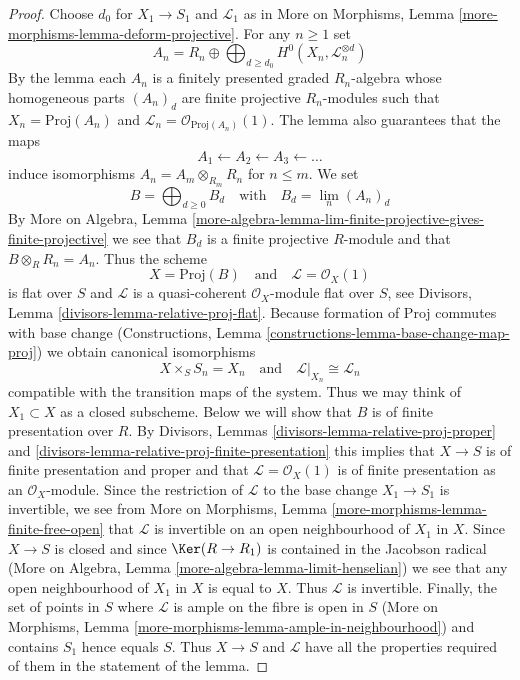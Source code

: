 \begin{proof}
Choose $d_0$ for $X_1 \to S_1$ and $\mathcal{L}_1$ as in
More on Morphisms, Lemma \ref{more-morphisms-lemma-deform-projective}.
For any $n \geq 1$ set
$$
A_n = R_n \oplus
\bigoplus\nolimits_{d \geq d_0} H^0(X_n, \mathcal{L}_n^{\otimes d})
$$
By the lemma each $A_n$ is a finitely presented graded $R_n$-algebra
whose homogeneous parts $(A_n)_d$ are finite projective $R_n$-modules
such that $X_n = \text{Proj}(A_n)$ and
$\mathcal{L}_n = \mathcal{O}_{\text{Proj}(A_n)}(1)$.
The lemma also guarantees that the maps
$$
A_1 \leftarrow A_2 \leftarrow A_3 \leftarrow \ldots
$$
induce isomorphisms $A_n = A_m \otimes_{R_m} R_n$ for $n \leq m$.
We set
$$
B = \bigoplus\nolimits_{d \geq 0} B_d
\quad\text{with}\quad
B_d = \lim_n (A_n)_d
$$
By More on Algebra, Lemma
\ref{more-algebra-lemma-lim-finite-projective-gives-finite-projective}
we see that $B_d$ is a finite projective $R$-module and that
$B \otimes_R R_n = A_n$. Thus the scheme
$$
X = \text{Proj}(B)
\quad\text{and}\quad
\mathcal{L} = \mathcal{O}_X(1)
$$
is flat over $S$ and $\mathcal{L}$ is a quasi-coherent $\mathcal{O}_X$-module
flat over $S$, see
Divisors, Lemma \ref{divisors-lemma-relative-proj-flat}.
Because formation of Proj commutes with base change
(Constructions, Lemma \ref{constructions-lemma-base-change-map-proj})
we obtain canonical isomorphisms
$$
X \times_S S_n = X_n
\quad\text{and}\quad
\mathcal{L}|_{X_n} \cong \mathcal{L}_n
$$
compatible with the transition maps of the system.
Thus we may think of $X_1 \subset X$ as a closed subscheme.
Below we will show that $B$ is of finite presentation over $R$.
By Divisors, Lemmas \ref{divisors-lemma-relative-proj-proper} and
\ref{divisors-lemma-relative-proj-finite-presentation}
this implies that $X \to S$ is of finite presentation
and proper and that $\mathcal{L} = \mathcal{O}_X(1)$
is of finite presentation as an $\mathcal{O}_X$-module.
Since the restriction of $\mathcal{L}$ to the base change
$X_1 \to S_1$ is invertible, we see from
More on Morphisms, Lemma \ref{more-morphisms-lemma-finite-free-open}
that $\mathcal{L}$ is invertible on an open neighbourhood of $X_1$ in $X$.
Since $X \to S$ is closed and since $\Ker(R \to R_1)$
is contained in the Jacobson radical
(More on Algebra, Lemma \ref{more-algebra-lemma-limit-henselian})
we see that any open neighbourhood of $X_1$ in $X$ is equal to $X$.
Thus $\mathcal{L}$ is invertible. Finally, the set of points in
$S$ where $\mathcal{L}$ is ample on the fibre is open in $S$
(More on Morphisms, Lemma \ref{more-morphisms-lemma-ample-in-neighbourhood})
and contains $S_1$ hence equals $S$. Thus $X \to S$ and $\mathcal{L}$
have all the properties required of them in the statement of the lemma.


\end{proof}
